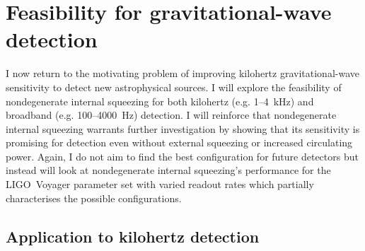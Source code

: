 \section{Feasibility for gravitational-wave detection}
\label{sec:nIS_sigRO_feasibility}

I now return to the motivating problem of improving kilohertz gravitational-wave sensitivity to detect new astrophysical sources. I will explore the feasibility of nondegenerate internal squeezing for both kilohertz (e.g. 1--4~kHz) and broadband (e.g. 100--4000~Hz) detection. I will reinforce that nondegenerate internal squeezing warrants further investigation by showing that its sensitivity is promising for detection even without external squeezing or increased circulating power. Again, I do not aim to find the best configuration for future detectors but instead will look at nondegenerate internal squeezing's performance for the LIGO~Voyager parameter set with varied readout rates which partially characterises the possible configurations.


\subsection{Application to kilohertz detection}

